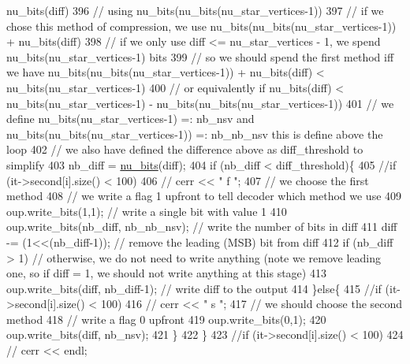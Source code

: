 \begin{DoxyCode}
{       nu\_bits(diff) }
396         \textcolor{comment}{// using nu\_bits(nu\_bits(nu\_star\_vertices-1))}
397         \textcolor{comment}{// if we chose this method of compression, we use nu\_bits(nu\_bits(nu\_star\_vertices-1)) +
       nu\_bits(diff)}
398         \textcolor{comment}{// if we only use diff <= nu\_star\_vertices - 1, we spend nu\_bits(nu\_star\_vertices-1) bits}
399         \textcolor{comment}{// so we should spend the first method iff we have nu\_bits(nu\_bits(nu\_star\_vertices-1)) +
       nu\_bits(diff) < nu\_bits(nu\_star\_vertices-1)}
400         \textcolor{comment}{// or equivalently if nu\_bits(diff) < nu\_bits(nu\_star\_vertices-1) -
       nu\_bits(nu\_bits(nu\_star\_vertices-1))}
401         \textcolor{comment}{// we define  nu\_bits(nu\_star\_vertices-1) =: nb\_nsv and nu\_bits(nu\_bits(nu\_star\_vertices-1)) =:
       nb\_nb\_nsv this is define above the loop}
402         \textcolor{comment}{// we also have defined the difference above as diff\_threshold to simplify}
403         nb\_diff = \hyperlink{bitstream_8cpp_a9dfce6f51e3febb3973aa3b16c2fecb4}{nu\_bits}(diff);
404         \textcolor{keywordflow}{if} (nb\_diff < diff\_threshold)\{
405           \textcolor{comment}{//if (it->second[i].size() < 100)}
406           \textcolor{comment}{//  cerr << " f ";}
407           \textcolor{comment}{// we choose the first method}
408           \textcolor{comment}{// we write a flag 1 upfront to tell decoder which method we use}
409           oup.write\_bits(1,1); \textcolor{comment}{// write a single bit with value 1}
410           oup.write\_bits(nb\_diff, nb\_nb\_nsv); \textcolor{comment}{// write the number of bits in diff }
411           diff -= (1<<(nb\_diff-1)); \textcolor{comment}{// remove the leading (MSB) bit from diff}
412           \textcolor{keywordflow}{if} (nb\_diff > 1) \textcolor{comment}{// otherwise, we do not need to write anything (note we remove leading one, so
       if diff = 1, we should not write anything at this stage)}
413             oup.write\_bits(diff, nb\_diff-1); \textcolor{comment}{// write diff to the output}
414         \}\textcolor{keywordflow}{else}\{
415           \textcolor{comment}{//if (it->second[i].size() < 100)}
416           \textcolor{comment}{//  cerr << " s ";}
417           \textcolor{comment}{// we should choose the second method}
418           \textcolor{comment}{// write a flag 0 upfront}
419           oup.write\_bits(0,1);
420           oup.write\_bits(diff, nb\_nsv);
421         \}
422       \}
423       \textcolor{comment}{//if (it->second[i].size() < 100)}
424       \textcolor{comment}{//  cerr << endl;}

\end{DoxyCode}
